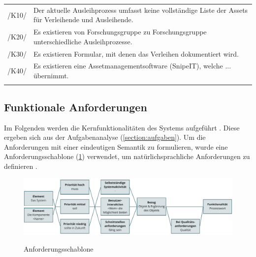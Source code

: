 \begin{center}
        \renewcommand{\arraystretch}{1.5}
        \begin{longtable}{lp{}}
                \arrayrulecolor{maincolor}\hline
                 \sffamily\color{maincolor}/K10/ & Der aktuelle Ausleihprozess umfasst keine
                 vollständige Liste der Assets für Verleihende und Ausleihende. \\
                 \sffamily\color{maincolor}/K20/ & Es existieren von Forschungsgruppe zu Forschungsgruppe
                unterschiedliche Ausleihprozesse. \\
                \sffamily\color{maincolor}/K30/ & Es existieren Formular, mit denen das Verleihen
                dokumentiert wird. \\
                \sffamily\color{maincolor}/K40/ & Es existieren eine Assetmanagementsoftware
                (SnipeIT), welche ... übernimmt. \\
                \arrayrulecolor{maincolor}\hline
        \end{longtable}
\end{center}

\vspace*{-1.5cm}

\subsection{Funktionale Anforderungen}
\label{section:funktionale}
Im Folgenden werden die Kernfunktionalitäten des Systems aufgeführt \cite{balzert2009}. Diese
ergeben sich aus der Aufgabenanalyse (\ref{section:aufgaben}). Um die Anforderungen mit einer
eindeutigen Semantik zu formulieren, wurde eine Anforderungsschablone (\ref{fig:schablone})
verwendet, um natürlichsprachliche Anforderungen zu definieren \cite{balzert2009}.

\begin{figure}[h]
        \centering
        \includegraphics[scale=0.45]{Bilder/anforderungsschablone.pdf}
        \label{fig:schablone}
        \caption[Anforderungsschablone]{Anforderungsschablone \cite{balzert2009}}
\end{figure}


